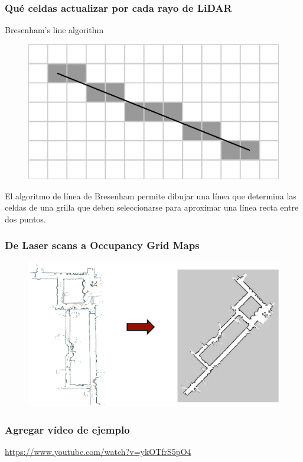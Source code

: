 \begin{frame}
    \frametitle{Qué celdas actualizar por cada rayo de LiDAR}
    Bresenham's line algorithm
    \begin{figure}[!h]
        \includegraphics[width=0.6\columnwidth]{./images/bresenham.pdf}
    \end{figure}

    El algoritmo de línea de Bresenham permite dibujar una línea que determina las celdas de una grilla que deben seleccionarse para aproximar una línea recta entre dos puntos.

\end{frame}


\begin{frame}
    \frametitle{De Laser scans a Occupancy Grid Maps}
   
    
    \begin{figure}[!h]
        \includegraphics[width=0.6\columnwidth]{./images/laser_scans_to_maps.pdf}
    \end{figure}

\end{frame}

\begin{frame}
    \frametitle{Agregar vídeo de ejemplo}
   

    \url{https://www.youtube.com/watch?v=ykOTfrS5pO4}
    
\end{frame}


